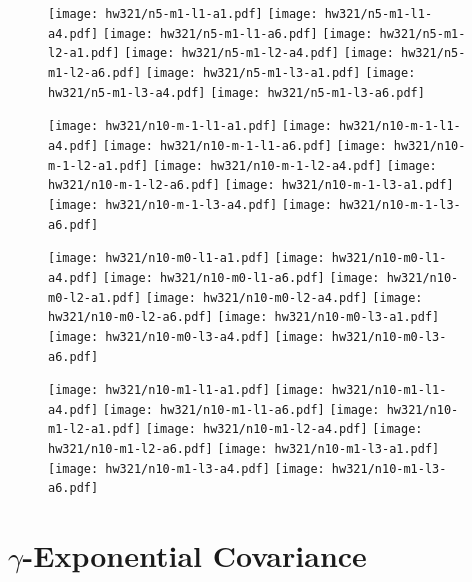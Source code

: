 \documentclass[12pt,letterpaper]{article}
\begin{document}
\begin{figure}
\begin{center}
\texttt{[image: hw321/n5-m1-l1-a1.pdf]}
\texttt{[image: hw321/n5-m1-l1-a4.pdf]}
\texttt{[image: hw321/n5-m1-l1-a6.pdf]}
\texttt{[image: hw321/n5-m1-l2-a1.pdf]}
\texttt{[image: hw321/n5-m1-l2-a4.pdf]}
\texttt{[image: hw321/n5-m1-l2-a6.pdf]}
\texttt{[image: hw321/n5-m1-l3-a1.pdf]}
\texttt{[image: hw321/n5-m1-l3-a4.pdf]}
\texttt{[image: hw321/n5-m1-l3-a6.pdf]}
\end{center}
\end{figure}
\begin{figure}
\begin{center}
\texttt{[image: hw321/n10-m-1-l1-a1.pdf]}
\texttt{[image: hw321/n10-m-1-l1-a4.pdf]}
\texttt{[image: hw321/n10-m-1-l1-a6.pdf]}
\texttt{[image: hw321/n10-m-1-l2-a1.pdf]}
\texttt{[image: hw321/n10-m-1-l2-a4.pdf]}
\texttt{[image: hw321/n10-m-1-l2-a6.pdf]}
\texttt{[image: hw321/n10-m-1-l3-a1.pdf]}
\texttt{[image: hw321/n10-m-1-l3-a4.pdf]}
\texttt{[image: hw321/n10-m-1-l3-a6.pdf]}
\end{center}
\end{figure}
\begin{figure}
\begin{center}
\texttt{[image: hw321/n10-m0-l1-a1.pdf]}
\texttt{[image: hw321/n10-m0-l1-a4.pdf]}
\texttt{[image: hw321/n10-m0-l1-a6.pdf]}
\texttt{[image: hw321/n10-m0-l2-a1.pdf]}
\texttt{[image: hw321/n10-m0-l2-a4.pdf]}
\texttt{[image: hw321/n10-m0-l2-a6.pdf]}
\texttt{[image: hw321/n10-m0-l3-a1.pdf]}
\texttt{[image: hw321/n10-m0-l3-a4.pdf]}
\texttt{[image: hw321/n10-m0-l3-a6.pdf]}
\end{center}
\end{figure}
\begin{figure}
\begin{center}
\texttt{[image: hw321/n10-m1-l1-a1.pdf]}
\texttt{[image: hw321/n10-m1-l1-a4.pdf]}
\texttt{[image: hw321/n10-m1-l1-a6.pdf]}
\texttt{[image: hw321/n10-m1-l2-a1.pdf]}
\texttt{[image: hw321/n10-m1-l2-a4.pdf]}
\texttt{[image: hw321/n10-m1-l2-a6.pdf]}
\texttt{[image: hw321/n10-m1-l3-a1.pdf]}
\texttt{[image: hw321/n10-m1-l3-a4.pdf]}
\texttt{[image: hw321/n10-m1-l3-a6.pdf]}
\end{center}
\end{figure}


\pagebreak
\section{$\gamma$-Exponential Covariance}
\end{document}
